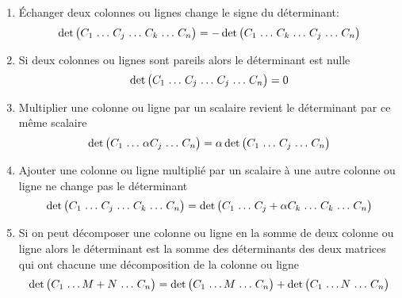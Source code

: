 \begin{enumerate}
    \item Échanger deux colonnes ou lignes change le signe du déterminant:
          \[\det \arraycolsep=0.3\arraycolsep \begin{pmatrix}
                  C_1 & \ldots & C_j & \ldots & C_k & \ldots & C_n
              \end{pmatrix} = -\det \begin{pmatrix}
                  C_1 & \ldots & C_k & \ldots & C_j & \ldots & C_n
              \end{pmatrix}\]
    \item Si deux colonnes ou lignes sont pareils alors le déterminant est nulle
          \[\det \arraycolsep=0.3\arraycolsep \begin{pmatrix}
                  C_1 & \ldots & C_j & \ldots & C_j & \ldots & C_n
              \end{pmatrix} = 0\]
    \item Multiplier une colonne ou ligne par un scalaire revient le déterminant par ce même scalaire
          \[\det \arraycolsep=0.3\arraycolsep \begin{pmatrix}
                  C_1 & \ldots & \alpha C_j & \ldots & C_n
              \end{pmatrix} = \alpha \det \begin{pmatrix}
                  C_1 & \ldots & C_j & \ldots & C_n
              \end{pmatrix}\]
    \item Ajouter une colonne ou ligne multiplié par un scalaire à une autre colonne ou ligne
          ne change pas le déterminant
          \[ \det \arraycolsep=0.3\arraycolsep \begin{pmatrix}
                  C_1 & \ldots & C_j & \ldots & C_k & \ldots & C_n
              \end{pmatrix} = \det \begin{pmatrix}
                  C_1 & \ldots & C_j + \alpha C_k & \ldots & C_k & \ldots & C_n
              \end{pmatrix}\]
    \item Si on peut décomposer une colonne ou ligne en la somme de deux colonne ou ligne
          alors le déterminant est la somme des déterminants des deux matrices qui ont chacune
          une décomposition de la colonne ou ligne
          \[ \det \arraycolsep=0.3\arraycolsep \begin{pmatrix}
                  C_1 & \ldots M + N & \ldots & C_n
              \end{pmatrix} = \det \begin{pmatrix}
                  C_1 & \ldots M & \ldots & C_n
              \end{pmatrix} + \det \begin{pmatrix}
                  C_1 & \ldots N & \ldots & C_n
              \end{pmatrix} \]
\end{enumerate}

